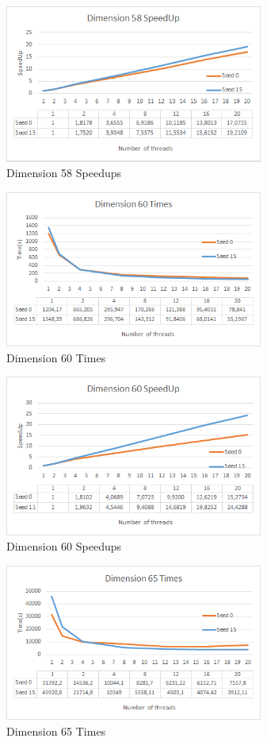\documentclass[conference]{IEEEtran}
\begin{document}
\begin{figure}[H]
\centering
\includegraphics[width=85mm]{TestesFinais/Dimension58Speedup}
\caption{Dimension 58 Speedups}
\end{figure}

\begin{figure}[H]
\centering
\includegraphics[width=85mm]{TestesFinais/Dimension60Times}
\caption{Dimension 60 Times}
\end{figure}

\begin{figure}[H]
\centering
\includegraphics[width=85mm]{TestesFinais/Dimension60Speedup}
\caption{Dimension 60 Speedups}
\end{figure}

\begin{figure}[H]
\centering
\includegraphics[width=85mm]{TestesFinais/Dimension65Times}
\caption{Dimension 65 Times}
\end{figure}
\end{document}
